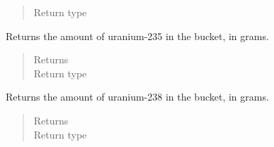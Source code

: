 \documentclass[letterpaper,10pt,openany,oneside,english]{sphinxmanual}
\begin{document}
\begin{fulllineitems}
\begin{fulllineitems}
\begin{quote}
\begin{description}
\item[{Return type}] \leavevmode
{}

\end{description}\end{quote}

\end{fulllineitems}


\begin{fulllineitems}
\label{\detokenize{support_rst/fuel_bundle:fuel_bundle.FuelBundle.get_fresh_U235_mass}}
Returns the amount of uranium-235 in the bucket, in grams.
\begin{quote}\begin{description}
\item[{Returns}] \leavevmode
{}

\item[{Return type}] \leavevmode
{}

\end{description}\end{quote}

\end{fulllineitems}


\begin{fulllineitems}
\label{\detokenize{support_rst/fuel_bundle:fuel_bundle.FuelBundle.get_fresh_u238_mass}}
Returns the amount of uranium-238 in the bucket, in grams.
\begin{quote}\begin{description}
\item[{Returns}] \leavevmode
{}

\item[{Return type}] \leavevmode
{}

\end{description}\end{quote}

\end{fulllineitems}


\end{fulllineitems}
\end{document}
